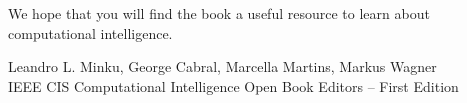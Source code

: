 We hope that you will find the book a useful resource to learn about computational intelligence.

\vspace{\baselineskip}
\begin{flushright}\noindent
Leandro L. Minku, George Cabral, Marcella Martins, Markus Wagner\\
IEEE CIS Computational Intelligence Open Book Editors -- First Edition 
\end{flushright}


